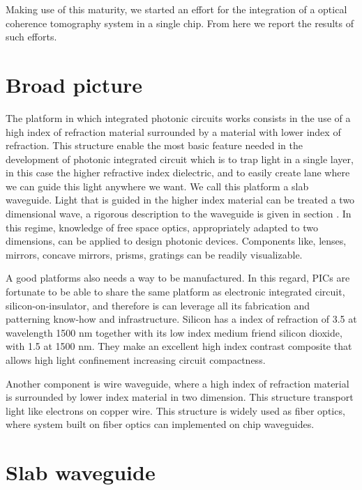 \documentclass[12pt,twoside,english]{book}
\renewcommand{\~}{\perispomeni}%
\numberwithin{equation}{section}
\numberwithin{figure}{section}
\begin{document}
Making use of this maturity, we started an effort for the integration of a optical coherence tomography system in a single chip. From here we report the results of such efforts. 

\section{Broad picture}

The platform in which integrated photonic circuits works consists in the use of a high index of refraction material surrounded by a material with lower index of refraction. This structure enable the most basic feature needed in the development of photonic integrated circuit which is to trap light in a single layer, in this case the higher refractive index dielectric, and to easily create lane where we can guide this light anywhere we want. We call this platform a \gls{slab waveguide}. Light that is guided in the higher index material can be treated a two dimensional wave, a rigorous description to the waveguide is given in section \label{section:slab waveguide}. In this regime, knowledge of free space optics, appropriately adapted to two dimensions, can be applied to design photonic devices. Components like, lenses, mirrors, concave mirrors, prisms, gratings can be readily visualizable.

A good platforms also needs a way to be manufactured. In this regard, PICs are fortunate to be able to share the same platform as electronic integrated circuit, silicon-on-insulator, and therefore is can leverage all its fabrication and patterning know-how and infrastructure. Silicon has a index of refraction of 3.5 at wavelength 1500 nm together with its low index medium friend silicon dioxide, with 1.5 at 1500 nm. They make an excellent high index contrast composite that allows high light confinement increasing circuit compactness.

Another component is wire waveguide, where a high index of refraction material is surrounded by lower index material in two dimension. This structure transport light like electrons on copper wire. This structure is widely used as fiber optics, where system built on fiber optics can implemented on chip waveguides.



\section{Slab waveguide}
\label{section:slab waveguide}
\end{document}
